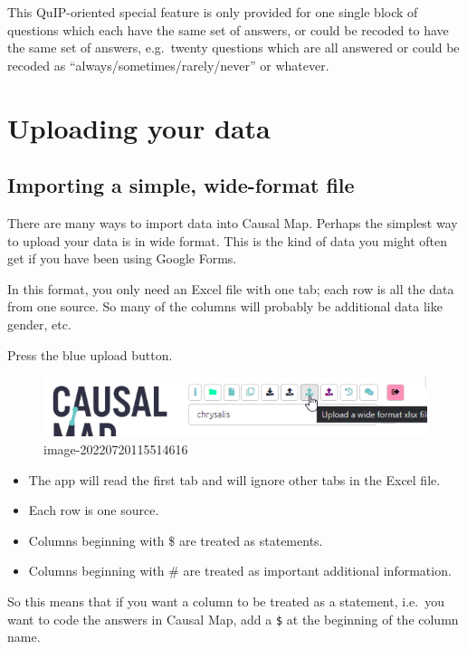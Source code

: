 \documentclass[
]{book}
\begin{document}
This QuIP-oriented special feature is only provided for one single block of questions which each have the same set of answers, or could be recoded to have the same set of answers, e.g.~twenty questions which are all answered or could be recoded as ``always/sometimes/rarely/never'' or whatever.

\hypertarget{ximport}{%
\chapter{Uploading your data}\label{ximport}}

\hypertarget{upload-summary}{%
\section{Importing a simple, wide-format file}\label{upload-summary}}

There are many ways to import data into Causal Map. Perhaps the simplest way to upload your data is in wide format. This is the kind of data you might often get if you have been using Google Forms.

In this format, you only need an Excel file with one tab; each row is all the data from one source. So many of the columns will probably be additional data like gender, etc.

Press the blue upload button.

\begin{figure}
\centering
\includegraphics{_assets/image-20220720115514616.png}
\caption{image-20220720115514616}
\end{figure}

\begin{itemize}
\item
  The app will read the first tab and will ignore other tabs in the Excel file.
\item
  Each row is one source.
\item
  Columns beginning with \$ are treated as statements.
\item
  Columns beginning with \# are treated as important additional information.
\end{itemize}

So this means that if you want a column to be treated as a statement, i.e.~you want to code the answers in Causal Map, add a \texttt{\$} at the beginning of the column name.
\end{document}
